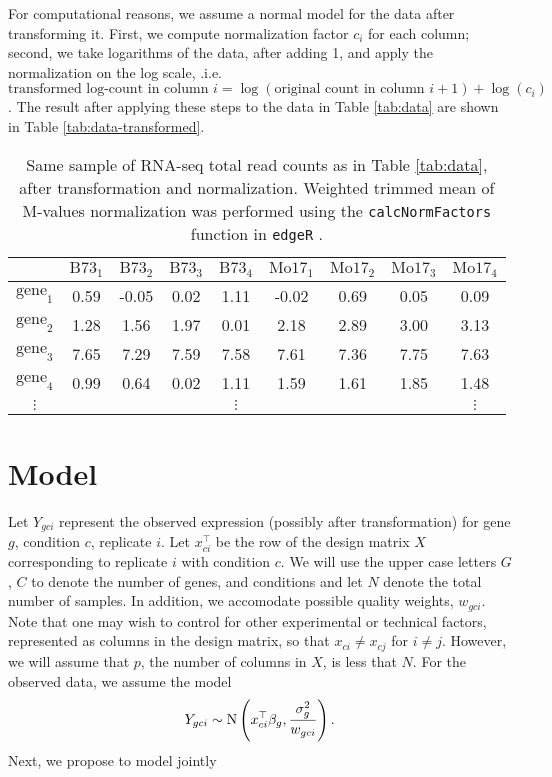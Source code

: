 For computational reasons, we assume a normal model for the data after transforming it. First, we compute normalization factor $c_i$ for each column; second, we take logarithms of the data, after adding 1, and apply the normalization on the log scale, .i.e.
$$\mbox{transformed log-count in column }i = \log (\mbox{original count in column }i+1) + \log(c_i)$$. The result after applying these steps to the data in Table \ref{tab:data} are shown in Table \ref{tab:data-transformed}.

\begin{table}[ht]
\centering
\caption{\small Same sample of RNA-seq total read counts as in Table \ref{tab:data}, after transformation and normalization. Weighted trimmed mean of M-values normalization was performed using the \texttt{calcNormFactors} function in \texttt{edgeR} \cite{edger2010}.}
\vspace{.2in}
\begin{tabular}{ccccccccc}
  \hline
 & $\mbox{B73}_1$ & $\mbox{B73}_2$ & $\mbox{B73}_3$ & $\mbox{B73}_4$ & $\mbox{Mo17}_1$ & $\mbox{Mo17}_2$ & $\mbox{Mo17}_3$ & $\mbox{Mo17}_4$ \\ 
  \hline
$\mbox{gene}_1$ & 0.59 & -0.05 & 0.02 & 1.11 & -0.02 & 0.69 & 0.05 & 0.09 \\ 
$\mbox{gene}_2$ & 1.28 & 1.56 & 1.97 & 0.01 & 2.18 & 2.89 & 3.00 & 3.13 \\ 
$\mbox{gene}_3$ & 7.65 & 7.29 & 7.59 & 7.58 & 7.61 & 7.36 & 7.75 & 7.63 \\ 
$\mbox{gene}_4$ & 0.99 & 0.64 & 0.02 & 1.11 & 1.59 & 1.61 & 1.85 & 1.48 \\ 
$\vdots$ &  &  &  & $\vdots$ &  & &  & $\vdots$ \\ 
   \hline
\end{tabular}
\end{table}

\section{Model}
\label{sec:model}
Let $Y_{gci}$ represent the observed expression (possibly after transformation) for gene $g$, condition $c$, replicate $i$. Let $x_{ci}^\top$ be the row of the design matrix $X$ corresponding to replicate $i$ with condition $c$. We will use the upper case letters $G$, $C$ to denote the number of genes, and conditions and let $N$ denote the total number of samples. In addition, we accomodate possible quality weights, $w_{gci}$.  Note that one may wish to control for other experimental or technical factors, represented as columns in the design matrix, so that $x_{ci} \neq x_{cj}$ for $i \neq j$. However, we will assume that $p$,  the number of columns in $X$, is less that $N$. For the observed data, we assume the model
\begin{equation}
Y_{gci} \sim \operatorname{N} \left( x_{ci}^\top \beta_g, \frac{\sigma^2_g}{w_{gci}} \right).
\end{equation}
Next, we propose to model jointly

